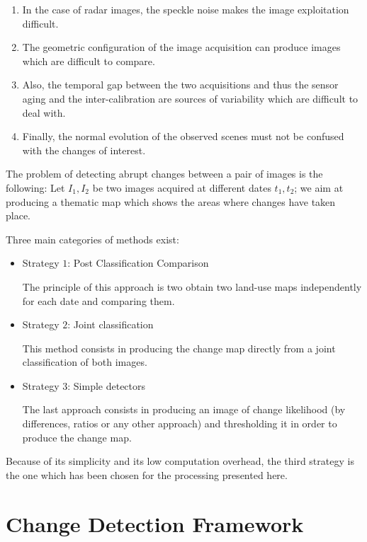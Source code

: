 \begin{enumerate}
\item In the case of radar images, the speckle noise makes the image
  exploitation difficult.
\item The geometric configuration of the image acquisition can produce
  images which are difficult to compare.
\item Also, the temporal gap between the two acquisitions and thus the
  sensor aging and the inter-calibration are sources of variability
  which are difficult to deal with.
\item Finally, the normal evolution of the observed scenes must not be
  confused with the changes of interest.
\end{enumerate}

The problem of detecting abrupt changes between a pair of images is
the following: Let $I_{1},I_{2}$ be two images acquired at different
dates $t_{1},t_{2}$; we aim at producing a thematic map which shows
the areas where changes have taken place.

Three main categories of methods exist:

\begin{itemize}
\item{Strategy $1$: Post Classification Comparison}

The principle of this approach \cite{Deer_1998} is two obtain two
land-use maps independently for each date and comparing them. 



\item{Strategy $2$: Joint classification}

This method consists in producing the change map directly from a joint
classification of both images.

\item{Strategy $3$: Simple detectors}

The last approach consists in producing an image of change likelihood
(by differences, ratios or any other approach) and thresholding it in
order to produce the change map.

\end{itemize}


Because of its simplicity and its low computation overhead, the third
strategy is the one which has been chosen for the processing
presented here.



\section{Change Detection Framework}
\label{sec:ChangeDetectionFramework}


